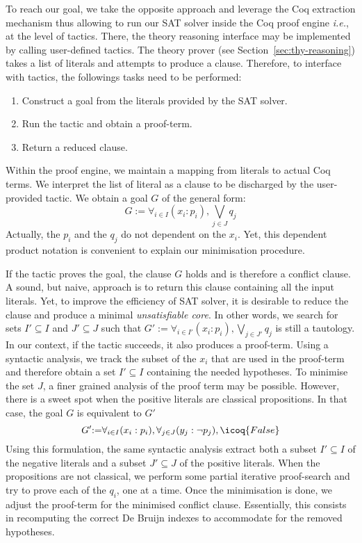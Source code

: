 \documentclass[utf8,a4paper,UKenglish,cleveref, autoref, thm-restate]{lipics-v2019}
\begin{document}
To reach our goal, we take the opposite approach and leverage the Coq
extraction mechanism thus allowing to run our SAT solver inside the
Coq proof engine \emph{i.e.}, at the level of tactics.
%
There, the theory reasoning interface may be implemented by calling
user-defined tactics.
%
The theory prover  (see Section~\ref{sec:thy-reasoning})
takes a list of literals and attempts to produce a clause.
Therefore, to interface with tactics, the followings tasks need to be performed:
\begin{enumerate}
\item Construct a goal from the literals provided by the SAT solver.
\item Run the tactic and obtain a proof-term.
\item Return a reduced clause.
\end{enumerate}
Within the proof engine, we maintain a mapping from literals to actual
Coq terms. We interpret the list of literal as a clause to be
discharged by the user-provided tactic. We obtain a goal $G$ of the general form:
\[
  G {:=} \forall_{i\in I} (x_i:p_i), \bigvee_{j\in J} q_j
\]
Actually, the $p_i$ and the $q_j$ do not dependent on the
$x_i$. Yet, this dependent product notation is convenient to
explain our minimisation procedure.

If the tactic proves the goal, the clause $G$ holds and is therefore a
conflict clause.  A sound, but naive, approach is to return this clause
containing all the input literals.
%
Yet, to improve the efficiency of SAT solver, it is desirable to
reduce the clause and produce a minimal \emph{unsatisfiable
  core}. In other words, we search for sets $I' \subseteq I$ and $J' \subseteq J$ such that
$
  G' {:=} \forall_{i\in I'} (x_i:p_i), \bigvee_{j\in J'} q_j
$ is still a tautology.
% 
In our context, if the tactic succeeds, it also produces a
proof-term.
%
Using a syntactic analysis, we track the subset of the $x_i$ that
are used in the proof-term and therefore obtain a set $I'\subseteq I$ containing the needed hypotheses.
%
To minimise the set $J$, a finer grained analysis of the proof term may be possible.
However, there is a sweet spot when the positive literals are classical propositions.
In that case, the goal $G$ is equivalent to $G'$
\[
  G' {:=} \forall_{i\in I} (x_i:p_i), \forall_{j\in J} (y_j:\neg p_j), \icoq{False}
\]
Using this formulation, the same syntactic analysis extract both a subset
$I' \subseteq I$ of the negative literals and a subset $J' \subseteq J$ of
the positive literals.  When the propositions are not classical, we
perform some partial iterative proof-search and try to prove each of
the $q_i$, one at a time.
%
Once the minimisation is done, we adjust the proof-term for the minimised
conflict clause. Essentially, this consists in recomputing the correct De Bruijn
indexes to accommodate for the removed hypotheses. 
\end{document}
